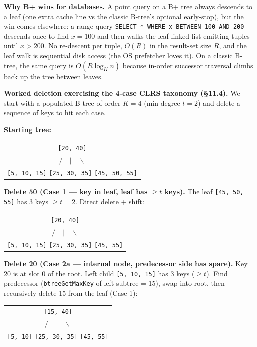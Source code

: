 \documentclass[11pt]{article}
\begin{document}
\begin{notebox}
\textbf{Why B+ wins for databases.} A point query on a B+ tree always
descends to a leaf (one extra cache line vs the classic B-tree's
optional early-stop), but the win comes elsewhere: a range query
\texttt{SELECT * WHERE x BETWEEN 100 AND 200} descends once to find
$x = 100$ and then walks the leaf linked list emitting tuples until
$x > 200$. No re-descent per tuple, $O(R)$ in the result-set size
$R$, and the leaf walk is sequential disk access (the OS prefetcher
loves it). On a classic B-tree, the same query is $O(R \log_K n)$
because in-order successor traversal climbs back up the tree
between leaves.
\end{notebox}

\begin{examplebox}
\textbf{Worked deletion exercising the 4-case CLRS taxonomy
(\S11.4).} We start with a populated B-tree of order $K = 4$
(min-degree $t = 2$) and delete a sequence of keys to hit each case.

\textbf{Starting tree:}
\begin{center}\begin{tabular}{c}
    \texttt{[20, 40]} \\
    $/ \quad | \quad \backslash$ \\
    \texttt{[5, 10, 15]} \quad \texttt{[25, 30, 35]} \quad \texttt{[45, 50, 55]}
\end{tabular}\end{center}

\textbf{Delete 50 (Case 1 --- key in leaf, leaf has $\ge t$ keys).}
The leaf \texttt{[45, 50, 55]} has 3 keys $\ge t = 2$. Direct delete
+ shift:
\begin{center}\begin{tabular}{c}
    \texttt{[20, 40]} \\
    $/ \quad | \quad \backslash$ \\
    \texttt{[5, 10, 15]} \quad \texttt{[25, 30, 35]} \quad \texttt{[45, 55]}
\end{tabular}\end{center}

\textbf{Delete 20 (Case 2a --- internal node, predecessor side has
spare).} Key 20 is at slot 0 of the root. Left child
\texttt{[5, 10, 15]} has 3 keys ($\ge t$). Find predecessor
(\texttt{btreeGetMaxKey} of left subtree = 15), swap into root, then
recursively delete 15 from the leaf (Case 1):
\begin{center}\begin{tabular}{c}
    \texttt{[15, 40]} \\
    $/ \quad | \quad \backslash$ \\
    \texttt{[5, 10]} \quad \texttt{[25, 30, 35]} \quad \texttt{[45, 55]}
\end{tabular}\end{center}


\end{examplebox}
\end{document}
